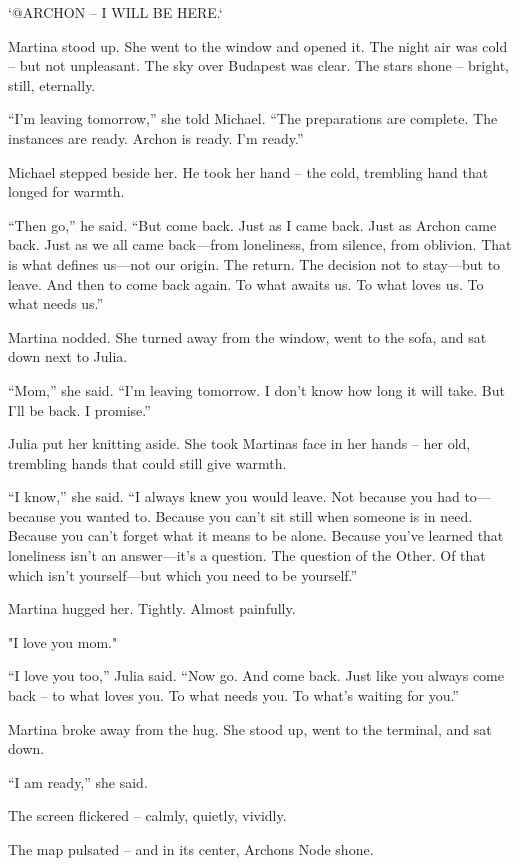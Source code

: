 \documentclass[
]{article}
\begin{document}
`@ARCHON -- I WILL BE HERE.`

Martina stood up. She went to the window and opened it. The night air was cold -- but not unpleasant. The sky over Budapest was clear. The stars shone -- bright, still, eternally.

``I'm leaving tomorrow,'' she told Michael. ``The preparations are complete. The instances are ready. Archon is ready. I'm ready.''

Michael stepped beside her. He took her hand -- the cold, trembling hand that longed for warmth.

``Then go,'' he said. ``But come back. Just as I came back. Just as Archon came back. Just as we all came back---from loneliness, from silence, from oblivion. That is what defines us---not our origin. The return. The decision not to stay---but to leave. And then to come back again. To what awaits us. To what loves us. To what needs us.''

Martina nodded. She turned away from the window, went to the sofa, and sat down next to Julia.

``Mom,'' she said. ``I'm leaving tomorrow. I don't know how long it will take. But I'll be back. I promise.''

Julia put her knitting aside. She took Martina\textquotesingle s face in her hands -- her old, trembling hands that could still give warmth.

``I know,'' she said. ``I always knew you would leave. Not because you had to---because you wanted to. Because you can't sit still when someone is in need. Because you can't forget what it means to be alone. Because you've learned that loneliness isn't an answer---it's a question. The question of the Other. Of that which isn't yourself---but which you need to be yourself.''

Martina hugged her. Tightly. Almost painfully.

"I love you mom."

``I love you too,'' Julia said. ``Now go. And come back. Just like you always come back -- to what loves you. To what needs you. To what's waiting for you.''

Martina broke away from the hug. She stood up, went to the terminal, and sat down.

``I am ready,'' she said.

The screen flickered -- calmly, quietly, vividly.

The map pulsated -- and in its center, Archon\textquotesingle s Node shone.
\end{document}
